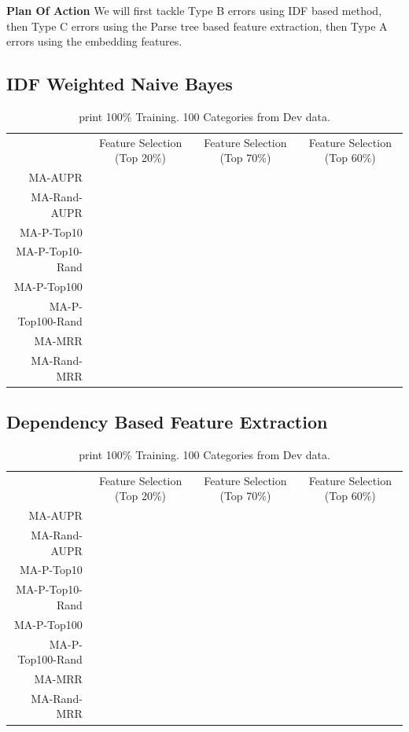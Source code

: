 \documentclass{article}
\begin{document}
\begin{notebox}
  \textbf{Plan Of Action}
  We will first tackle Type B errors using IDF based method,
  then Type C errors using the Parse tree based feature extraction,
  then Type A errors using the embedding features.
\end{notebox}

\subsection{IDF Weighted Naive Bayes}
\label{ssec:results-idf-weighted-naive}
\begin{table}[htbp]
  \centering
{}
  \begin{tabular}{r  c  c c }\toprule
                 & Feature Selection (Top 20\%) & Feature Selection (Top 70\%) & Feature Selection (Top 60\%) \\
MA-AUPR          &                         \\
MA-Rand-AUPR     &                         \\
MA-P-Top10       &                         \\
MA-P-Top10-Rand  &                         \\
MA-P-Top100      &                         \\
MA-P-Top100-Rand &                         \\
MA-MRR           &                         \\
MA-Rand-MRR      &                         \\
\bottomrule\end{tabular}
  \caption{print 100\% Training. 100 Categories from Dev data.}
  \label{tab:summary-idf-weighted-naive}
\end{table}

\subsection{Dependency Based Feature Extraction}
\label{ssec:results-dependency}
\begin{table}[htbp]
  \centering
{}
  \begin{tabular}{r  c  c c }\toprule
                 & Feature Selection (Top 20\%) & Feature Selection (Top 70\%) & Feature Selection (Top 60\%) \\
MA-AUPR          &                         \\
MA-Rand-AUPR     &                         \\
MA-P-Top10       &                         \\
MA-P-Top10-Rand  &                         \\
MA-P-Top100      &                         \\
MA-P-Top100-Rand &                         \\
MA-MRR           &                         \\
MA-Rand-MRR      &                         \\
\bottomrule\end{tabular}
  \caption{print 100\% Training. 100 Categories from Dev data.}
  \label{tab:summary-dependency}
\end{table}
\end{document}
